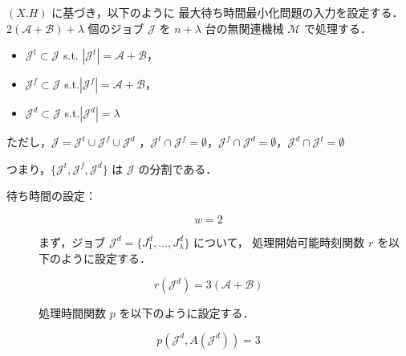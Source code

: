 \documentclass[12pt]{optlab-bachelor}
\begin{document}
$(X.H)$ に基づき，以下のように 最大待ち時間最小化問題の入力を設定する．
$2(\mathcal{A} + \mathcal{B}) + \lambda$ 個のジョブ $\mathcal{J}$ を
$n + \lambda$ 台の無関連機械 $\mathcal{M}$ で処理する．
\begin{itemize}
  \item $\mathcal{J}^t \subset \mathcal{J}$ s.t. $|\mathcal{J}^t| =
  \mathcal{A}  + \mathcal{B}$，
  \item $\mathcal{J}^f \subset \mathcal{J}$
  s.t.$|\mathcal{J}^f| = \mathcal{A}  + \mathcal{B}$，
  \item $\mathcal{J}^d \subset \mathcal{J}$ s.t.$|\mathcal{J}^d| =
  \lambda$
\end{itemize}
ただし，$\mathcal{J} = \mathcal{J}^t \cup \mathcal{J}^f \cup
\mathcal{J}^d$ ，$\mathcal{J}^t \cap \mathcal{J}^f = \emptyset$，$\mathcal{J}^f \cap \mathcal{J}^d = \emptyset$，$\mathcal{J}^d \cap \mathcal{J}^t = \emptyset$

つまり，$\{\mathcal{J}^t, \mathcal{J}^f,\mathcal{J}^d\}$ は $\mathcal{J}$ の分割である．

\begin{description}
  \item[待ち時間の設定：]
\end{description}
$$w = 2$$
\begin{description}
  \item[] まず，ジョブ $\mathcal{J}^d = \{J^d_1,\ldots,J^d_{\lambda}\}$ について，
  処理開始可能時刻関数 $r$ を以下のように設定する．
\end{description}
$$r(\mathcal{J}^d) = 3(\mathcal{A} + \mathcal{B})$$
\begin{description}
  \item[] 処理時間関数 $p$ を以下のように設定する．
\end{description}
$$p(\mathcal{J}^d, A(\mathcal{J}^d)) = 3$$
\end{document}
